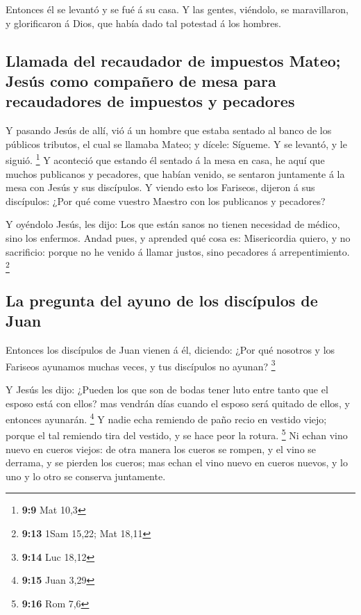  Entonces él se levantó y se fué á su casa. 
Y las gentes, viéndolo, se maravillaron, y glorificaron á Dios, que
había dado tal potestad á los hombres.

\hypertarget{llamada-del-recaudador-de-impuestos-mateo-jesuxfas-como-compauxf1ero-de-mesa-para-recaudadores-de-impuestos-y-pecadores}{%
\subsection{Llamada del recaudador de impuestos Mateo; Jesús como
compañero de mesa para recaudadores de impuestos y
pecadores}\label{llamada-del-recaudador-de-impuestos-mateo-jesuxfas-como-compauxf1ero-de-mesa-para-recaudadores-de-impuestos-y-pecadores}}

 Y pasando Jesús de allí, vió á un hombre que estaba
sentado al banco de los públicos tributos, el cual se llamaba Mateo; y
dícele: Sígueme. Y se levantó, y le siguió. \footnote{\textbf{9:9} Mat
  10,3}  Y aconteció que estando él sentado á la mesa en
casa, he aquí que muchos publicanos y pecadores, que habían venido, se
sentaron juntamente á la mesa con Jesús y sus discípulos.
 Y viendo esto los Fariseos, dijeron á sus discípulos:
¿Por qué come vuestro Maestro con los publicanos y pecadores?

 Y oyéndolo Jesús, les dijo: Los que están sanos no
tienen necesidad de médico, sino los enfermos.  Andad
pues, y aprended qué cosa es: Misericordia quiero, y no sacrificio:
porque no he venido á llamar justos, sino pecadores á arrepentimiento.
\footnote{\textbf{9:13} 1Sam 15,22; Mat 18,11}

\hypertarget{la-pregunta-del-ayuno-de-los-discuxedpulos-de-juan}{%
\subsection{La pregunta del ayuno de los discípulos de
Juan}\label{la-pregunta-del-ayuno-de-los-discuxedpulos-de-juan}}

 Entonces los discípulos de Juan vienen á él, diciendo:
¿Por qué nosotros y los Fariseos ayunamos muchas veces, y tus discípulos
no ayunan? \footnote{\textbf{9:14} Luc 18,12}

 Y Jesús les dijo: ¿Pueden los que son de bodas tener
luto entre tanto que el esposo está con ellos? mas vendrán días cuando
el esposo será quitado de ellos, y entonces ayunarán. \footnote{\textbf{9:15}
  Juan 3,29}  Y nadie echa remiendo de paño recio en
vestido viejo; porque el tal remiendo tira del vestido, y se hace peor
la rotura. \footnote{\textbf{9:16} Rom 7,6}  Ni echan
vino nuevo en cueros viejos: de otra manera los cueros se rompen, y el
vino se derrama, y se pierden los cueros; mas echan el vino nuevo en
cueros nuevos, y lo uno y lo otro se conserva juntamente.

